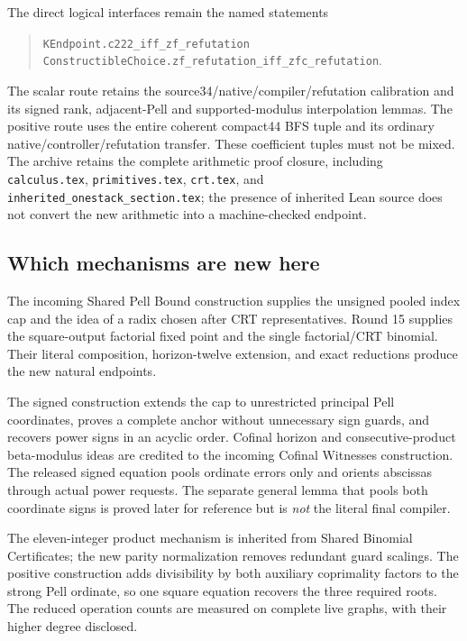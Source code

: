 The direct logical interfaces remain the named statements
\begin{quote}\small
\nolinkurl{KEndpoint.c222_iff_zf_refutation}\\
\nolinkurl{ConstructibleChoice.zf_refutation_iff_zfc_refutation}.
\end{quote}
The scalar route retains the source34/native/compiler/refutation calibration and its signed rank, adjacent-Pell and supported-modulus interpolation lemmas. The positive route uses the entire coherent compact44 BFS tuple and its ordinary native/controller/refutation transfer. These coefficient tuples must not be mixed. The archive retains the complete arithmetic proof closure, including \nolinkurl{calculus.tex}, \nolinkurl{primitives.tex}, \nolinkurl{crt.tex}, and \nolinkurl{inherited_onestack_section.tex}; the presence of inherited Lean source does not convert the new arithmetic into a machine-checked endpoint.

\subsection{Which mechanisms are new here}
The incoming Shared Pell Bound construction supplies the unsigned pooled index cap and the idea of a radix chosen after CRT representatives. Round 15 supplies the square-output factorial fixed point and the single factorial/CRT binomial. Their literal composition, horizon-twelve extension, and exact reductions produce the new natural endpoints.

The signed construction extends the cap to unrestricted principal Pell coordinates, proves a complete anchor without unnecessary sign guards, and recovers power signs in an acyclic order. Cofinal horizon and consecutive-product beta-modulus ideas are credited to the incoming Cofinal Witnesses construction. The released signed equation pools ordinate errors only and orients abscissas through actual power requests. The separate general lemma that pools both coordinate signs is proved later for reference but is \emph{not} the literal final compiler.

The eleven-integer product mechanism is inherited from Shared Binomial Certificates; the new parity normalization removes redundant guard scalings. The positive construction adds divisibility by both auxiliary coprimality factors to the strong Pell ordinate, so one square equation recovers the three required roots. The reduced operation counts are measured on complete live graphs, with their higher degree disclosed.

